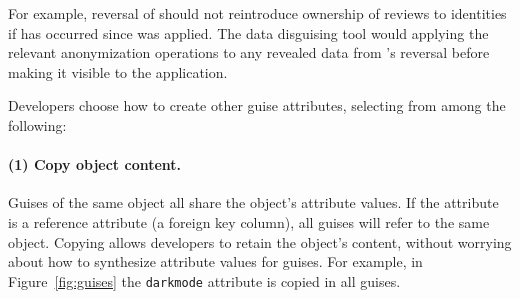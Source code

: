 For example, reversal of \gdpr should not reintroduce ownership of reviews to identities if \ca has
occurred since \gdpr was applied. The data disguising tool would applying the relevant \ca
anonymization operations to any revealed data from \gdpr's reversal before making it visible to the application.


\iffalse
%

%
%
%
Developers choose how to create other guise attributes, selecting from among the following:
%
\paragraph{(1) Copy object content.}
%
Guises of the same object all share the object's attribute values.
%
If the attribute is a reference attribute (\eg a foreign key column), all guises will refer to the same object.
%
%
Copying allows developers to retain the object's content, without worrying about how to
synthesize attribute values for guises.
%
For example, in Figure~\ref{fig:guises} the \texttt{darkmode} attribute is copied in
all guises.

